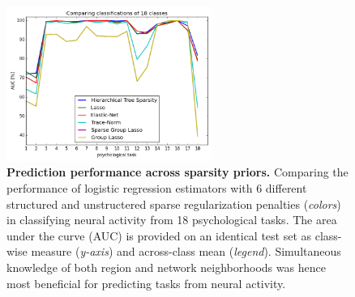 \documentclass[runningheads,a4paper]{llncs}
\begin{document}
%
\begin{figure}
\vspace{-0.6cm}
\begin{centering}
\includegraphics[width=0.60\textwidth]{../figures/ROC_ALL_perclass.png}
\vspace{-0.65cm}
\caption{\textbf{Prediction performance across sparsity priors.}
Comparing the performance of logistic regression estimators
with 6 different structured and unstructered
sparse regularization penalties (\textit{colors})
in classifying neural activity from 18 psychological tasks.
The area under the curve (AUC)
is provided on an identical test set
as class-wise measure (\textit{y-axis}) and across-class mean (\textit{legend}).
%
%
Simultaneous knowledge of both region and network neighborhoods
was hence most beneficial for predicting
tasks from neural activity.
}
\end{centering}
\label{fig_sparsities}
\vspace{-0.6cm}
\end{figure}
%
\end{document}
